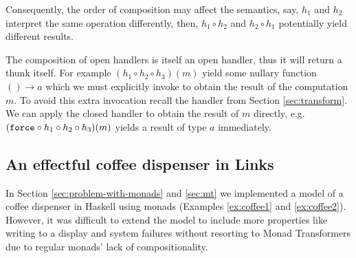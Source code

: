 Consequently, the order of composition may affect the semantics, say, $h_1$ and $h_2$ interpret the same operation differently, then, $h_1 \circ h_2$ and $h_2 \circ h_1$ potentially yield different results.

The composition of open handlers is itself an open handler, thus it will return a thunk itself. For example $(h_1 \circ h_2 \circ h_3)(m)$ yield some nullary function $() \to a$ which we must explicitly invoke to obtain the result of the computation $m$. To avoid this extra invocation recall the  handler from Section \ref{sec:transform}. We can apply the closed handler  to obtain the result of $m$ directly, e.g. $(\texttt{force} \circ h_1 \circ h_2 \circ h_3)(m)$ yields a result of type $a$ immediately.

\subsection{An effectful coffee dispenser in Links}
In Section \ref{sec:problem-with-monads} and \ref{sec:mt} we implemented a model of a coffee dispenser in Haskell using monads (Examples \ref{ex:coffee1} and \ref{ex:coffee2}). However, it was difficult to extend the model to include more properties like writing to a display and system failures without resorting to Monad Transformers due to regular monads' lack of compositionality.

